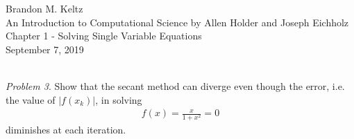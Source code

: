 \documentclass{article}
\begin{document}
	
	\begin{flushleft}	
	
		Brandon M. Keltz\\
		An Introduction to Computational Science by Allen Holder and Joseph Eichholz\\
		Chapter 1 - Solving Single Variable Equations\\
		September 7, 2019\\\
		
		\textit{Problem 3}. Show that the secant method can diverge even though the error, i.e. the value of $|f(x_k)|$, in solving
			\begin{align*}
				f(x) = \frac{x}{1 + x^2} = 0
			\end{align*}
			diminishes at each iteration.
		
	
	\end{flushleft}
	
\end{document}
